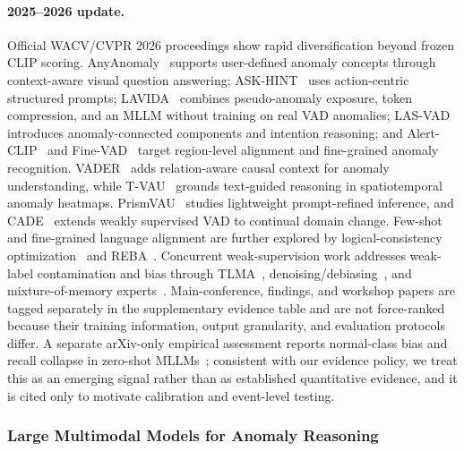 \documentclass[10pt,a4paper]{article}
\begin{document}
\paragraph{2025--2026 update.} Official WACV/CVPR 2026 proceedings show rapid diversification beyond frozen CLIP scoring. AnyAnomaly~\citep{ahn2026anyanomaly} supports user-defined anomaly concepts through context-aware visual question answering; ASK-HINT~\citep{zou2026askhint} uses action-centric structured prompts; LAVIDA~\citep{dai2026lavida} combines pseudo-anomaly exposure, token compression, and an MLLM without training on real VAD anomalies; LAS-VAD~\citep{wang2026lasvad} introduces anomaly-connected components and intention reasoning; and Alert-CLIP~\citep{zhu2026alertclip} and Fine-VAD~\citep{zhang2026finevad} target region-level alignment and fine-grained anomaly recognition. VADER~\citep{cheng2026vader} adds relation-aware causal context for anomaly understanding, while T-VAU~\citep{gu2026tvau} grounds text-guided reasoning in spatiotemporal anomaly heatmaps. PrismVAU~\citep{erregue2026prismvau} studies lightweight prompt-refined inference, and CADE~\citep{hashimoto2026cade} extends weakly supervised VAD to continual domain change. Few-shot and fine-grained language alignment are further explored by logical-consistency optimization~\citep{zheng2026lco} and REBA~\citep{chu2026reba}. Concurrent weak-supervision work addresses weak-label contamination and bias through TLMA~\citep{xu2026tlma}, denoising/debiasing~\citep{zhao2026denoising}, and mixture-of-memory experts~\citep{sun2026memoryexperts}. Main-conference, findings, and workshop papers are tagged separately in the supplementary evidence table and are not force-ranked because their training information, output granularity, and evaluation protocols differ. A separate arXiv-only empirical assessment reports normal-class bias and recall collapse in zero-shot MLLMs~\citep{yao2026realitycheck}; consistent with our evidence policy, we treat this as an emerging signal rather than as established quantitative evidence, and it is cited only to motivate calibration and event-level testing.

\subsubsection{Large Multimodal Models for Anomaly Reasoning}
\end{document}
